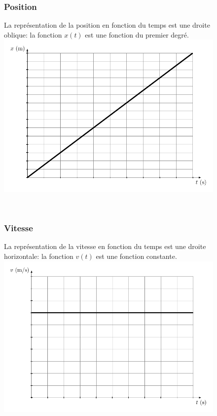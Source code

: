 \documentclass[
  a4paper,
  DIV=11,
  numbers=noendperiod,
  sans]{scrartcl}
\theoremstyle{definition}
\theoremstyle{definition}
\theoremstyle{remark}
\begin{document}
\begin{figure}

\begin{minipage}{0.47\linewidth}

\subsubsection{Position}\label{position}

La représentation de la position en fonction du temps est une droite
oblique: la fonction \(x(t)\) est une fonction du premier degré.
\includegraphics[width=1\textwidth,height=\textheight]{figures/mru/fig4.pdf}\end{minipage}%
%
\begin{minipage}{0.05\linewidth}
~\end{minipage}%
%
\begin{minipage}{0.47\linewidth}

\subsubsection{Vitesse}\label{vitesse}

La représentation de la vitesse en fonction du temps est une droite
horizontale: la fonction \(v(t)\) est une fonction constante.
\includegraphics[width=1\textwidth,height=\textheight]{figures/mru/fig5.pdf}\end{minipage}%


\end{figure}
\end{document}
